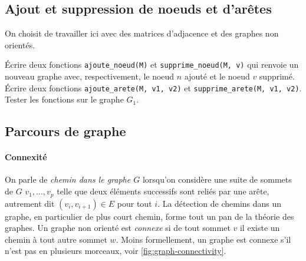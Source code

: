 \subsection*{Ajout et suppression de noeuds et d'arêtes }

On choisit de travailler ici avec des matrices d'adjacence et des graphes non orientés.

\quessques Écrire deux fonctions \texttt{ajoute\_noeud(M)} et \texttt{supprime\_noeud(M, v)} qui renvoie un nouveau graphe avec, respectivement, le noeud $ n $ ajouté et le noeud $ v $ supprimé.
\ssques Écrire deux fonctions \texttt{ajoute\_arete(M, v1, v2)} et \texttt{supprime\_arete(M, v1, v2)}. Tester les fonctions sur le graphe $ G_1 $.

\subsection*{Parcours de graphe}

\paragraph{Connexité} On parle de \textit{chemin dans le graphe $ G $} lorsqu'on considère une suite de sommets de $ G $ $ v_1, \ldots, v_p $ telle que deux éléments successifs sont reliés par une arête, autrement dit $ (v_i, v_{i+1}) \in E $ pour tout $ i $. La détection de chemins dans un graphe, en particulier de plus court chemin, forme tout un pan de la théorie des graphes. Un graphe non orienté est \textit{connexe} si de tout sommet $ v $ il existe un chemin à tout autre sommet $ w $. Moins formellement, un graphe est connexe s'il n'est pas en plusieurs morceaux, voir \autoref{fig:graph-connectivity}.

